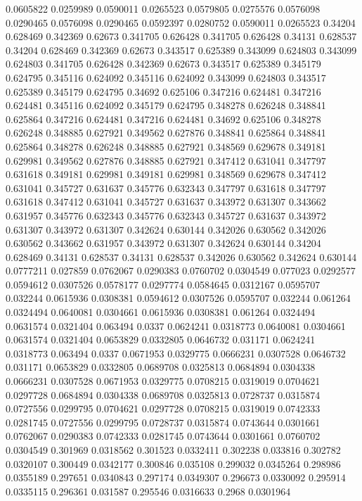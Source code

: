 0.0605822 0.0259989
0.0590011 0.0265523
0.0579805 0.0275576
0.0576098 0.0290465
0.0576098 0.0290465
0.0592397 0.0280752
0.0590011 0.0265523
0.34204 0.628469
0.342369 0.62673
0.341705 0.626428
0.341705 0.626428
0.34131 0.628537
0.34204 0.628469
0.342369 0.62673
0.343517 0.625389
0.343099 0.624803
0.343099 0.624803
0.341705 0.626428
0.342369 0.62673
0.343517 0.625389
0.345179 0.624795
0.345116 0.624092
0.345116 0.624092
0.343099 0.624803
0.343517 0.625389
0.345179 0.624795
0.34692 0.625106
0.347216 0.624481
0.347216 0.624481
0.345116 0.624092
0.345179 0.624795
0.348278 0.626248
0.348841 0.625864
0.347216 0.624481
0.347216 0.624481
0.34692 0.625106
0.348278 0.626248
0.348885 0.627921
0.349562 0.627876
0.348841 0.625864
0.348841 0.625864
0.348278 0.626248
0.348885 0.627921
0.348569 0.629678
0.349181 0.629981
0.349562 0.627876
0.348885 0.627921
0.347412 0.631041
0.347797 0.631618
0.349181 0.629981
0.349181 0.629981
0.348569 0.629678
0.347412 0.631041
0.345727 0.631637
0.345776 0.632343
0.347797 0.631618
0.347797 0.631618
0.347412 0.631041
0.345727 0.631637
0.343972 0.631307
0.343662 0.631957
0.345776 0.632343
0.345776 0.632343
0.345727 0.631637
0.343972 0.631307
0.343972 0.631307
0.342624 0.630144
0.342026 0.630562
0.342026 0.630562
0.343662 0.631957
0.343972 0.631307
0.342624 0.630144
0.34204 0.628469
0.34131 0.628537
0.34131 0.628537
0.342026 0.630562
0.342624 0.630144
0.0777211 0.027859
0.0762067 0.0290383
0.0760702 0.0304549
0.077023 0.0292577
0.0594612 0.0307526
0.0578177 0.0297774
0.0584645 0.0312167
0.0595707 0.032244
0.0615936 0.0308381
0.0594612 0.0307526
0.0595707 0.032244
0.061264 0.0324494
0.0640081 0.0304661
0.0615936 0.0308381
0.061264 0.0324494
0.0631574 0.0321404
0.063494 0.0337
0.0624241 0.0318773
0.0640081 0.0304661
0.0631574 0.0321404
0.0653829 0.0332805
0.0646732 0.031171
0.0624241 0.0318773
0.063494 0.0337
0.0671953 0.0329775
0.0666231 0.0307528
0.0646732 0.031171
0.0653829 0.0332805
0.0689708 0.0325813
0.0684894 0.0304338
0.0666231 0.0307528
0.0671953 0.0329775
0.0708215 0.0319019
0.0704621 0.0297728
0.0684894 0.0304338
0.0689708 0.0325813
0.0728737 0.0315874
0.0727556 0.0299795
0.0704621 0.0297728
0.0708215 0.0319019
0.0742333 0.0281745
0.0727556 0.0299795
0.0728737 0.0315874
0.0743644 0.0301661
0.0762067 0.0290383
0.0742333 0.0281745
0.0743644 0.0301661
0.0760702 0.0304549
0.301969 0.0318562
0.301523 0.0332411
0.302238 0.033816
0.302782 0.0320107
0.300449 0.0342177
0.300846 0.035108
0.299032 0.0345264
0.298986 0.0355189
0.297651 0.0340843
0.297174 0.0349307
0.296673 0.0330092
0.295914 0.0335115
0.296361 0.031587
0.295546 0.0316633
0.2968 0.0301964

